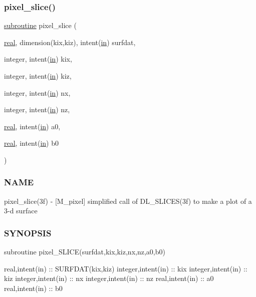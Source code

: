 \subsubsection{\texorpdfstring{pixel\+\_\+slice()}{pixel\_slice()}}
{\footnotesize\ttfamily \hyperlink{M__stopwatch_83_8txt_acfbcff50169d691ff02d4a123ed70482}{subroutine} pixel\+\_\+slice (\begin{DoxyParamCaption}\item[{\hyperlink{read__watch_83_8txt_abdb62bde002f38ef75f810d3a905a823}{real}, dimension(kix,kiz), intent(\hyperlink{M__journal_83_8txt_afce72651d1eed785a2132bee863b2f38}{in})}]{surfdat,  }\item[{integer, intent(\hyperlink{M__journal_83_8txt_afce72651d1eed785a2132bee863b2f38}{in})}]{kix,  }\item[{integer, intent(\hyperlink{M__journal_83_8txt_afce72651d1eed785a2132bee863b2f38}{in})}]{kiz,  }\item[{integer, intent(\hyperlink{M__journal_83_8txt_afce72651d1eed785a2132bee863b2f38}{in})}]{nx,  }\item[{integer, intent(\hyperlink{M__journal_83_8txt_afce72651d1eed785a2132bee863b2f38}{in})}]{nz,  }\item[{\hyperlink{read__watch_83_8txt_abdb62bde002f38ef75f810d3a905a823}{real}, intent(\hyperlink{M__journal_83_8txt_afce72651d1eed785a2132bee863b2f38}{in})}]{a0,  }\item[{\hyperlink{read__watch_83_8txt_abdb62bde002f38ef75f810d3a905a823}{real}, intent(\hyperlink{M__journal_83_8txt_afce72651d1eed785a2132bee863b2f38}{in})}]{b0 }\end{DoxyParamCaption})}



\subsubsection*{N\+A\+ME}

pixel\+\_\+slice(3f) -\/ \mbox{[}M\+\_\+pixel\mbox{]} simplified call of D\+L\+\_\+\+S\+L\+I\+C\+E\+S(3f) to make a plot of a 3-\/d surface 

\subsubsection*{S\+Y\+N\+O\+P\+S\+IS}

subroutine pixel\+\_\+\+S\+L\+I\+C\+E(surfdat,kix,kiz,nx,nz,a0,b0)

real,intent(in) \+:\+: S\+U\+R\+F\+D\+A\+T(kix,kiz) integer,intent(in) \+:\+: kix integer,intent(in) \+:\+: kiz integer,intent(in) \+:\+: nx integer,intent(in) \+:\+: nz real,intent(in) \+:\+: a0 real,intent(in) \+:\+: b0

